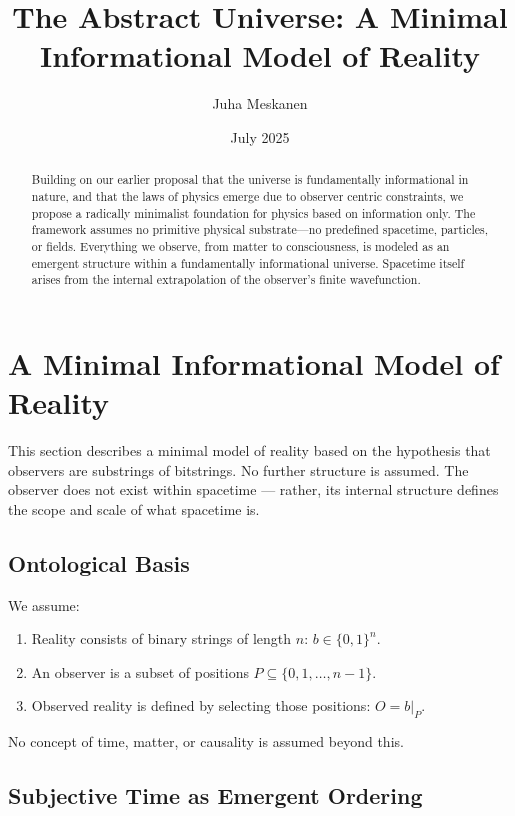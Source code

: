 \documentclass[11pt]{article}
\title{The Abstract Universe: A Minimal Informational Model of Reality}
\author{Juha Meskanen}
\date{July 2025}
\begin{document}
\maketitle


\begin{abstract}
    Building on our earlier proposal that the universe is fundamentally informational in nature,
    and that the laws of physics emerge due to observer centric constraints, we propose a radically minimalist foundation for physics based on information only.
    The framework assumes no primitive physical substrate—no predefined spacetime, particles, or fields.
    Everything we observe, from matter to consciousness, is modeled as an emergent structure within a fundamentally informational universe.
    Spacetime itself arises from the internal extrapolation of the observer’s finite wavefunction.
\end{abstract}

\section{A Minimal Informational Model of Reality}

This section describes a minimal model of reality based on the hypothesis that observers are substrings of bitstrings. No further structure is assumed.
The observer does not exist within spacetime — rather, its internal structure defines the scope and scale of what spacetime is.

\subsection{Ontological Basis}

We assume:

\begin{enumerate}
    \item Reality consists of binary strings of length $n$: $b \in \{0,1\}^n$.
    \item An observer is a subset of positions $P \subseteq \{0,1,\dots,n-1\}$.
    \item Observed reality is defined by selecting those positions: $O = b|_P$.
\end{enumerate}

No concept of time, matter, or causality is assumed beyond this.



\subsection{Subjective Time as Emergent Ordering}
\end{document}
